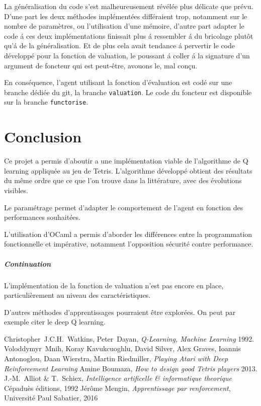 \documentclass{report}
\begin{document}
La généralisation du code s'est malheureusement révélée plus
délicate que prévu. D'une part les deux méthodes implémentées
différaient trop, notamment sur le nombre de paramètres, ou
l'utilisation d'une mémoire, d'autre part adapter le code \'a ces deux
implémentations finissait plus \'a ressembler \'a du bricolage plutôt qu'\'a
de la généralisation. Et de plus cela avait tendance \'a pervertir le code
développé pour la fonction de valuation, le poussant \'a coller \'a la
signature d'un argument de foncteur qui est peut-être, avouons le, mal conçu.

En conséquence, l'agent utilisant la fonction d'évaluation est codé sur
une branche dédiée du git, la branche \texttt{valuation}. Le code du
foncteur est disponible sur la branche \texttt{functorise}.
\chapter*{Conclusion}
Ce projet a permis d'aboutir a une implémentation viable de l'algorithme de Q
learning appliquée au jeu de Tetris. L'algorithme développé obtient des résultats
du même ordre que ce que l'on trouve dans la littérature, avec des évolutions
visibles.

Le paramétrage permet d'adapter le comportement de l'agent en fonction des
performances souhaitées.

L'utilisation d'OCaml a permis d'aborder les différences entre la programmation
fonctionnelle et impérative, notamment l'opposition sécurité contre performance.

\paragraph{Continuation}
L'implémentation de la fonction de valuation n'est pas encore en place,
particulièrement au niveau des caractéristiques.

D'autres méthodes d'apprentissages pourraient être explorées. On peut par
exemple citer le deep Q learning\cite{deepmind}.

\begin{thebibliography}{9}
    Christopher~J.C.H.~Watkins, Peter~Dayan,
    \textit{Q-Learning, Machine Learning}
    1992.
    Voloddymyr~Mnih, Koray Kavukcuoghlu, David Silver, Alex Graves, Ioannis
    Antonoglou, Daan Wierstra, Martin Riedmiller,
    \textit{Playing Atari with Deep Reinforcement Learning}
    Amine Boumaza,
    \textit{How to design good Tetris players}
    2013.
    J.-M.~Alliot \& T.~Schiex,
    \textit{Intelligence artificelle \& informatique theorique}
    C\'epadu\`es \'editions, 1992
    J\'er\^ome Mengin,
    \textit{Apprentissage par renforcement},
    Université Paul Sabatier, 2016
\end{thebibliography}
\end{document}

